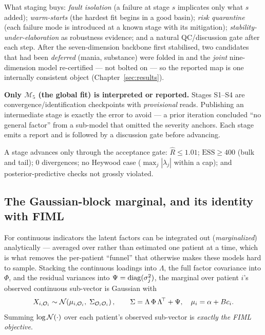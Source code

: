 What staging buys: \emph{fault isolation} (a failure at stage $s$ implicates only what $s$ added);
\emph{warm-starts} (the hardest fit begins in a good basin); \emph{risk quarantine} (each failure mode is
introduced at a known stage with its mitigation); \emph{stability-under-elaboration} as robustness evidence;
and a natural QC/discussion gate after each step. After the seven-dimension backbone first stabilised, two
candidates that had been \emph{deferred} (mania, substance) were folded in and the \emph{joint} nine-dimension
model re-certified --- not bolted on --- so the reported map is one internally consistent object
(Chapter~\ref{sec:results}).

\begin{invariantbox}
\textbf{Only $\mathcal{M}_5$ (the global fit) is interpreted or reported.} Stages S1--S4 are
convergence/identification checkpoints with \emph{provisional} reads. Publishing an intermediate stage is
exactly the error to avoid --- a prior iteration concluded ``no general factor'' from a sub-model that omitted
the severity anchors. Each stage emits a report and is followed by a discussion gate before advancing.
\end{invariantbox}

A stage advances only through the acceptance gate: $\widehat{R}\le 1.01$; $\mathrm{ESS}\ge 400$ (bulk and
tail); $0$ divergences; no Heywood case ($\max_j|\lambda_j|$ within a cap); and posterior-predictive checks not
grossly violated.

\subsection{The Gaussian-block marginal, and its identity with FIML}
For continuous indicators the latent factors can be integrated out (\emph{marginalized}) analytically ---
averaged over rather than estimated one patient at a time, which is what removes the per-patient ``funnel''
that otherwise makes these models hard to sample. Stacking the continuous
loadings into $\Lambda$, the full factor covariance into $\Phi$, and the residual variances into
$\Psi=\operatorname{diag}(\sigma_j^2)$, the marginal over patient $i$'s observed continuous sub-vector is Gaussian with
\begin{equation}
\label{eq:marginal}
X_{i,\mathcal{O}_i}\sim\mathcal{N}\!\left(\mu_{i,\mathcal{O}_i},\;\Sigma_{\mathcal{O}_i\mathcal{O}_i}\right),
\qquad \Sigma=\Lambda\,\Phi\,\Lambda^{\!\top}+\Psi,\quad \mu_i=\alpha+B c_i .
\end{equation}
Summing $\log\mathcal{N}(\cdot)$ over each patient's observed sub-vector is \emph{exactly the FIML objective}.

